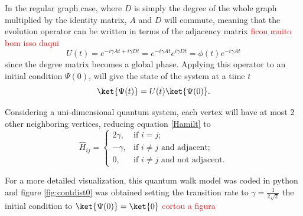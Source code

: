             	In the regular graph case, where $D$ is simply the degree of the whole graph multiplied by the identity matrix, $A$ and $D$ will commute, meaning that the evolution operator can be written in terms of the adjacency matrix \textcolor{red}{ficou muito bom isso daqui}
            	\begin{equation}
            	   U(t) = e^{-i\gamma A t + i\gamma D t} = e^{-i\gamma A t} e^{i\gamma D t} = \phi(t) e^{-i\gamma A t} 
            	\end{equation}
            	since the degree matrix becomes a global phase.
            	Applying this operator to an initial condition $\Psi(0)$, will give the state of the system at a time $t$
                \begin{equation}
                    \ket{\Psi(t)} = U(t)\ket{\Psi(0)}.
                \end{equation}\par
                Considering a uni-dimensional quantum system, each vertex will have at most 2 other neighboring vertices, reducing equation \ref{Hamilt} to
                \begin{equation}
                \hat{H}_{ij} = \begin{cases} 
                            2\gamma, & \mbox{if } i= j; \\ 
                            -\gamma, & \mbox{if } i\neq j\mbox{ and adjacent};\\
                            0, & \mbox{if } i\neq j\mbox{ and not adjacent}.
                        \end{cases}
                \end{equation}\par
                For a more detailed visualization, this quantum walk model was coded in python and figure \ref{fig:contdist0} was obtained setting the transition rate to $\gamma=\frac{1}{2\sqrt{2}}$ the initial condition to $\ket{\Psi(0)} = \ket{0}$ \textcolor{red}{cortou a figura}
                
